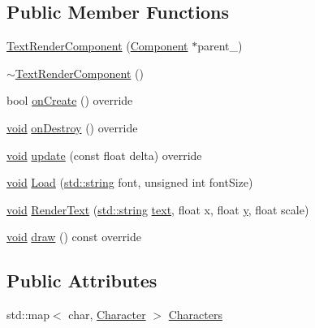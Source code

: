 \subsection*{Public Member Functions}
\begin{DoxyCompactItemize}
\item 
\hyperlink{classTextRenderComponent_a1c68e979570639a0f422b0c65f13cc1f}{Text\+Render\+Component} (\hyperlink{classComponent}{Component} $\ast$parent\+\_\+)
\item 
\hyperlink{classTextRenderComponent_ac1558f65e70d5392ced81e8667c77ed1}{$\sim$\+Text\+Render\+Component} ()
\item 
bool \hyperlink{classTextRenderComponent_aafaf33608a83d1ff4af66ef53ba81b29}{on\+Create} () override
\item 
\hyperlink{imgui__impl__opengl3__loader_8h_ac668e7cffd9e2e9cfee428b9b2f34fa7}{void} \hyperlink{classTextRenderComponent_a097fb07ecd0e1feed1c4c2bd7c97d480}{on\+Destroy} () override
\item 
\hyperlink{imgui__impl__opengl3__loader_8h_ac668e7cffd9e2e9cfee428b9b2f34fa7}{void} \hyperlink{classTextRenderComponent_a73c53ed27b94597551536fda5775fb49}{update} (const float delta) override
\item 
\hyperlink{imgui__impl__opengl3__loader_8h_ac668e7cffd9e2e9cfee428b9b2f34fa7}{void} \hyperlink{classTextRenderComponent_a5e1f85aded3b9c661483b62984c675d1}{Load} (\hyperlink{imgui__impl__opengl3__loader_8h_ac83513893df92266f79a515488701770}{std\+::string} font, unsigned int font\+Size)
\item 
\hyperlink{imgui__impl__opengl3__loader_8h_ac668e7cffd9e2e9cfee428b9b2f34fa7}{void} \hyperlink{classTextRenderComponent_a548a98c1048447ac5c27aae8dcf1df36}{Render\+Text} (\hyperlink{imgui__impl__opengl3__loader_8h_ac83513893df92266f79a515488701770}{std\+::string} \hyperlink{game__play__state_8cpp_a295b62c787445f811e691da4b10f6be4}{text}, float x, float \hyperlink{imgui__impl__opengl3__loader_8h_a5e247fc24ceb70d83f6ad59149b8910a}{y}, float scale)
\item 
\hyperlink{imgui__impl__opengl3__loader_8h_ac668e7cffd9e2e9cfee428b9b2f34fa7}{void} \hyperlink{classTextRenderComponent_adb02fc97e8e67e7d3035b38c2860bfab}{draw} () const override
\end{DoxyCompactItemize}
\subsection*{Public Attributes}
\begin{DoxyCompactItemize}
\item 
std\+::map$<$ char, \hyperlink{structCharacter}{Character} $>$ \hyperlink{classTextRenderComponent_a96cfcacedd8e2dc8d39055b2e75c4376}{Characters}
\end{DoxyCompactItemize}
